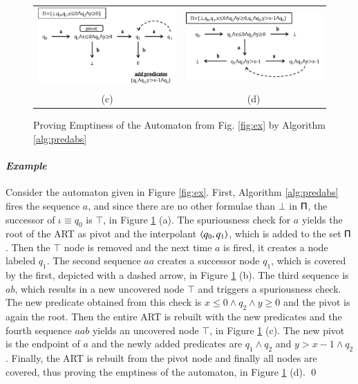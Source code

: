 \documentclass[10pt]{llncs}
\begin{document}
\begin{figure}[htb]
\begin{center}
\begin{tabular}{cc}
\includegraphics[scale=0.5]{PA3.pdf} & \includegraphics[scale=0.5]{PA4.pdf} \\[-2mm]
\tiny{(c)} & \tiny{(d)}
\end{tabular}
\end{center}
\caption{Proving Emptiness of the Automaton from Fig. \ref{fig:ex} by Algorithm \ref{alg:predabs}}
\label{fig:pa}
\end{figure}

\paragraph{\em Example}
Consider the automaton given in Figure \ref{fig:ex}. First, Algorithm
\ref{alg:predabs} fires the sequence $a$, and since there are no other
formulae than $\bot$ in $\mathsf{\Pi}$, the successor of $\iota \equiv q_0$
is $\top$, in Figure \ref{fig:pa} (a). The spuriousness check for $a$
yields the root of the ART as pivot and the interpolant
$\left\langle q_0,q_1 \right\rangle$, which is added to the set $\mathsf{\Pi}$. Then the $\top$
node is removed and the next time $a$ is fired, it creates a node
labeled $q_1$. The second sequence $aa$ creates a successor node
$q_1$, which is covered by the first, depicted with a dashed arrow, in
Figure \ref{fig:pa} (b). The third sequence is $ab$, which results in
a new uncovered node $\top$ and triggers a spuriousness check. The new
predicate obtained from this check is $x\leq0\wedge q_2 \wedge y\geq0$
and the pivot is again the root. Then the entire ART is rebuilt with
the new predicates and the fourth sequence $aab$ yields an uncovered
node $\top$, in Figure \ref{fig:pa} (c). The new pivot is the endpoint
of $a$ and the newly added predicates are $q_1\wedge q_2$ and $y>x-1
\wedge q_2$. Finally, the ART is rebuilt from the pivot node and
finally all nodes are covered, thus proving the emptiness of the
automaton, in Figure \ref{fig:pa} (d). \qed
\end{document}
